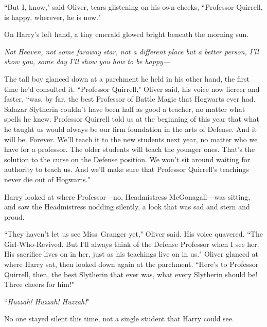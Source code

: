 ``But I, know," said Oliver, tears glistening on his own cheeks, ``Professor Quirrell, is happy, wherever, he is now."

On Harry's left hand, a tiny emerald glowed bright beneath the morning sun.

\emph{Not Heaven, not some faraway star, not a different place but a better person, I'll show you, some day I'll show you how to be happy—}

The tall boy glanced down at a parchment he held in his other hand, the first time he'd consulted it. ``Professor Quirrell," Oliver said, his voice now fiercer and faster, ``was, by far, the best Professor of Battle Magic that Hogwarts ever had. Salazar Slytherin couldn't have been half as good a teacher, no matter what spells he knew. Professor Quirrell told us at the beginning of this year that what he taught us would always be our firm foundation in the arts of Defense. And it will be. Forever. We'll teach it to the new students next year, no matter who we have for a professor. The older students will teach the younger ones. That's the solution to the curse on the Defense position. We won't sit around waiting for authority to teach us. And we'll make sure that Professor Quirrell's teachings never die out of Hogwarts."

Harry looked at where Professor—no, Headmistress McGonagall—was sitting, and saw the Headmistress nodding silently, a look that was sad and stern and proud.

``They haven't let us see Miss~Granger yet," Oliver said. His voice quavered. ``The Girl-Who-Revived. But I'll always think of the Defense Professor when I see her. His sacrifice lives on in her, just as his teachings live on in us." Oliver glanced at where Harry sat, then looked down again at the parchment. ``Here's to Professor Quirrell, then, the best Slytherin that ever was, what every Slytherin should be! Three cheers for him!"

``\emph{Huzzah! Huzzah! Huzzah!}"

No one stayed silent this time, not a single student that Harry could see.

